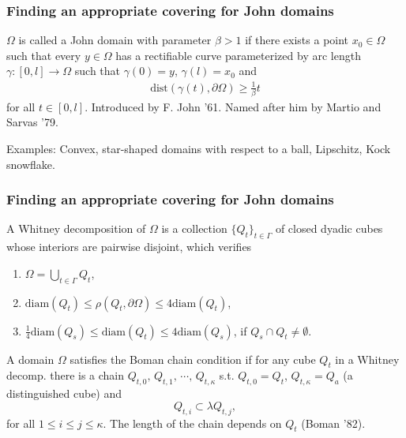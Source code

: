 \documentclass[small,xcolor=svgnames]{beamer}
\def\O{\Omega}
\def\c{\color{blue}}
\begin{document}

\begin{frame}\frametitle{Finding an appropriate covering for John domains}

$\O$ is called a {\c John domain} with parameter $\beta>1$ if there exists a point $x_0\in\O$ such that every $y\in\O$ has a rectifiable curve parameterized by arc length $\gamma:[0,l]\to\Omega$ such that $\gamma(0)=y$, $\gamma(l)=x_0$ and 
\begin{eqnarray*}
\text{dist}(\gamma(t),\partial\O)\geq \frac{1}{\beta}t
\end{eqnarray*}
for all $t\in[0,l]$. Introduced by F. John '61. Named after him by Martio and Sarvas '79.

\bigskip

{\c Examples}: Convex, star-shaped domains with respect to a ball, Lipschitz, Kock snowflake.



\end{frame}



\begin{frame}\frametitle{Finding an appropriate covering for John domains}

A {\c Whitney decomposition} of $\O$ is a collection $\{Q_t\}_{t\in\Gamma}$ of closed dyadic cubes whose interiors are pairwise disjoint, which verifies
\begin{enumerate}
\item $\O=\bigcup_{t\in\Gamma}Q_t$,
\item $\text{diam}(Q_t) \leq \rho(Q_t,\partial\Omega) \leq 4\text{diam}(Q_t)$,
\item $\frac{1}{4}\text{diam}(Q_s)\leq \text{diam}(Q_t)\leq 4\text{diam}(Q_s)$, if $Q_s\cap Q_t\neq \emptyset$.
\end{enumerate}

\bigskip

A domain $\O$ satisfies the {\c Boman chain condition} if for any cube $Q_t$ in a Whitney decomp. there is a chain $Q_{t,0},\, Q_{t,1},\, \cdots,\, Q_{t,\kappa}$ s.t. $Q_{t,0}=Q_t$,  $Q_{t,\kappa}=Q_a$ (a distinguished cube) and 
\[Q_{t,i}\subset \lambda Q_{t,j},\]
for all $1\leq i\leq j\leq \kappa$. The length of the chain depends on $Q_t$ (Boman '82). 

\end{frame}
\end{document}
